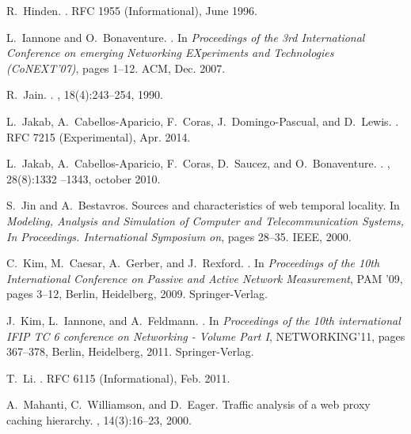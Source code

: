 \documentclass[twocolumn, 10pt]{article}
\theoremstyle{plain}
\begin{document}
\begin{thebibliography}{10}
R.~Hinden.
.
\newblock RFC 1955 (Informational), June 1996.

L.~Iannone and O.~Bonaventure.
.
\newblock In {\em Proceedings of the 3rd International Conference on emerging
  Networking EXperiments and Technologies (CoNEXT'07)}, pages 1--12. ACM, Dec.
  2007.

R.~Jain.
.
, 18(4):243--254, 1990.

L.~Jakab, A.~Cabellos-Aparicio, F.~Coras, J.~Domingo-Pascual, and D.~Lewis.
.
\newblock RFC 7215 (Experimental), Apr. 2014.

L.~Jakab, A.~Cabellos-Aparicio, F.~Coras, D.~Saucez, and O.~Bonaventure.
.
, 28(8):1332
  --1343, october 2010.

S.~Jin and A.~Bestavros.
\newblock Sources and characteristics of web temporal locality.
\newblock In {\em Modeling, Analysis and Simulation of Computer and
  Telecommunication Systems, In Proceedings. International Symposium on}, pages
  28--35. IEEE, 2000.

C.~Kim, M.~Caesar, A.~Gerber, and J.~Rexford.
.
\newblock In {\em Proceedings of the 10th International Conference on Passive
  and Active Network Measurement}, PAM '09, pages 3--12, Berlin, Heidelberg,
  2009. Springer-Verlag.

J.~Kim, L.~Iannone, and A.~Feldmann.
.
\newblock In {\em Proceedings of the 10th international IFIP TC 6 conference on
  Networking - Volume Part I}, NETWORKING'11, pages 367--378, Berlin,
  Heidelberg, 2011. Springer-Verlag.

T.~Li.
.
\newblock RFC 6115 (Informational), Feb. 2011.

A.~Mahanti, C.~Williamson, and D.~Eager.
\newblock Traffic analysis of a web proxy caching hierarchy.
, 14(3):16--23, 2000.


\end{thebibliography}
\end{document}
